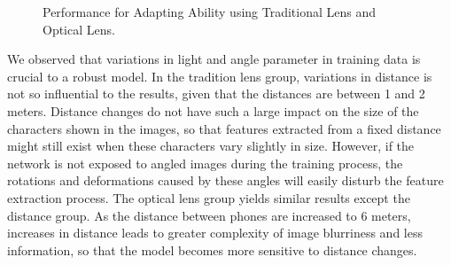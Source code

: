 \begin{figure}[!t]
    \centering
    \hfill
    \caption[Optical Lens]{Performance for Adapting Ability using Traditional Lens and Optical Lens.}
    \label{fig:adapting}
\end{figure}

We observed that variations in light and angle parameter in training data is crucial to a robust model. In the tradition lens group, variations in distance is not so influential to the results, given that the distances are between 1 and 2 meters. Distance changes do not have such a large impact on the size of the characters shown in the images, so that features extracted from a fixed distance might still exist when these characters vary slightly in size. However, if the network is not exposed to angled images during the training process, the rotations and deformations caused by these angles will easily disturb the feature extraction process. The optical lens group yields similar results except the distance group. As the distance between phones are increased to 6 meters, increases in distance leads to greater complexity of image blurriness and less information, so that the model becomes more sensitive to distance changes.

